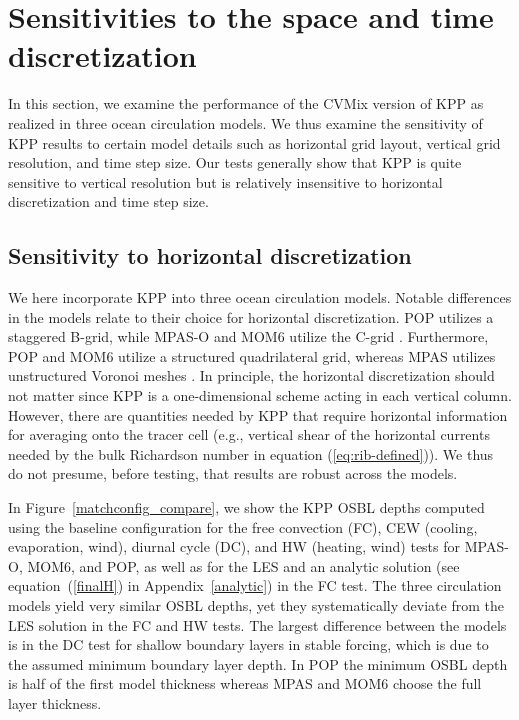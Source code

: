 \documentclass[preprint,12pt,authoryear]{agujournal}
\begin{document}
\section{Sensitivities to the space and time discretization} 
\label{section:RTresults}

In this section, we examine the performance of the CVMix version of KPP as realized in three ocean circulation models.  We thus examine the sensitivity of KPP results to certain model details such as horizontal grid layout, vertical grid resolution, and time step size.  Our tests generally show that KPP is quite sensitive to vertical resolution but is relatively insensitive to horizontal discretization and time step size.

\subsection{Sensitivity to horizontal discretization}

We here incorporate KPP into three ocean circulation models.  Notable differences in the models relate to their choice for horizontal discretization. POP utilizes a staggered B-grid, while MPAS-O and MOM6 utilize the C-grid \citep{arakawa1981potential}.  Furthermore, POP and MOM6 utilize a structured quadrilateral grid, whereas MPAS utilizes unstructured Voronoi meshes \citep{ringler2013multi}. In principle, the horizontal discretization should not matter since KPP is a one-dimensional scheme acting in each vertical column. However, there are quantities needed by KPP that require horizontal information for averaging onto the tracer cell (e.g., vertical shear of the horizontal currents needed by the bulk Richardson number in equation (\ref{eq:rib-defined})). We thus do not presume, before testing, that results are robust across the models.   

In Figure~\ref{matchconfig_compare}, we show the KPP OSBL depths computed using the baseline configuration for the free convection (FC), CEW (cooling, evaporation, wind), diurnal cycle (DC), and HW (heating, wind) tests for MPAS-O, MOM6, and POP, as well as for the LES and an analytic solution (see equation~(\ref{finalH}) in Appendix~\ref{analytic}) in the FC test. The three circulation models yield very similar OSBL depths, yet they systematically deviate from the LES solution in the FC and HW tests.  The largest difference between the models is in the DC test for shallow boundary layers in stable forcing, which is due to the assumed minimum boundary layer depth.  In POP the minimum OSBL depth is half of the first model thickness whereas MPAS and MOM6 choose the full layer thickness.  
\end{document}
